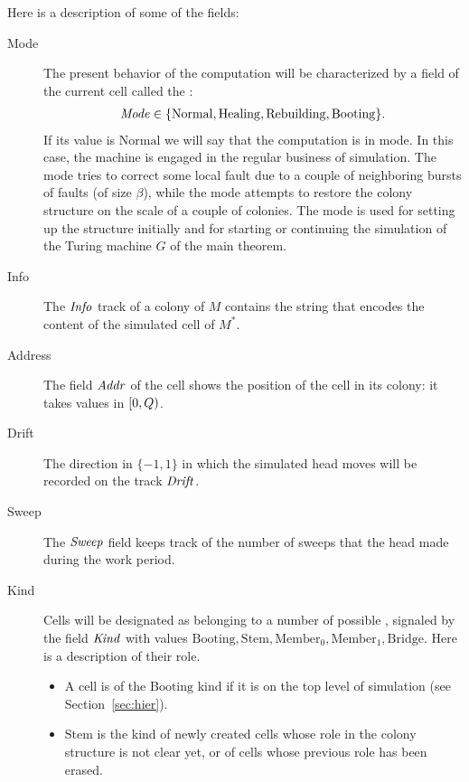 \documentclass[11pt]{memoir}
\theoremstyle{definition} %
\newcommand{\fld}[1]{\ensuremath{\textit{#1\/}}}
\def\G{G} %
\newcommand{\Q}{Q} %
\newcommand{\Addr}{\fld{Addr}}
\newcommand{\Drift}{\fld{Drift}}
\newcommand{\Info}{\fld{Info}}
\newcommand{\Kind}{\fld{Kind}}
\newcommand{\Mode}{\fld{Mode}}
\newcommand{\Sweep}{\fld{Sweep}} %
\newcommand{\Normal}{\mathrm{Normal}}
\newcommand{\Healing}{\mathrm{Healing}}
\newcommand{\Rebuilding}{\mathrm{Rebuilding}}
\newcommand{\Stem}{\mathrm{Stem}}
\newcommand{\Booting}{\mathrm{Booting}}
\newcommand{\Bridge}{\mathrm{Bridge}}
\newcommand{\Member}{\mathrm{Member}}
\begin{document}
Here is a description of some of the fields:
\begin{description}
\item[Mode] The present behavior of the computation will be characterized by
a field of the current cell called the :
 \begin{align*}
   \Mode\in\{ \Normal,\Healing, \Rebuilding,\Booting \}.
 \end{align*}
 If its value is \( \Normal \) we will say that the computation is in  mode.
 In this case, the machine is engaged in the regular business of simulation.
The  mode tries to correct some local fault due to a couple of neighboring
bursts of faults (of size \( \beta \)),
while the  mode attempts to restore the colony structure
on the scale of a couple of colonies.
The  mode is used for setting up the structure initially and for starting or continuing the
simulation of the Turing machine \( \G \) of the main theorem.

\item[Info] The  \( \Info \) track of a colony of \( M \)
  contains the string that encodes the content of the simulated cell of \( M^{*} \).

\item[Address] The field \( \Addr \)
of the cell shows the position of the cell in its colony:
it takes values in \( \lint{0}{\Q} \).

\item[Drift] The direction in \( \{-1,1\} \) in which the simulated head moves will be recorded on the track
 \( \Drift \).

\item[Sweep] The \( \Sweep \)
  field keeps track of the number of sweeps that the head made during the work period.

\item[Kind] Cells will be designated as belonging to a number of
  possible , signaled by the field \( \Kind \)
with values \(  \Booting, \Stem, \Member_{0},\Member_{1},\Bridge \).
Here is a description of their role.
\begin{itemize}
\item A cell is of the \( \Booting \) kind if it is on the top level of simulation (see Section~\ref{sec:hier}).

\item \( \Stem \) is the kind of newly created cells
  whose role in the colony structure is not clear yet, or of cells whose previous
  role has been erased.


\end{itemize}
\end{description}
\end{document}
